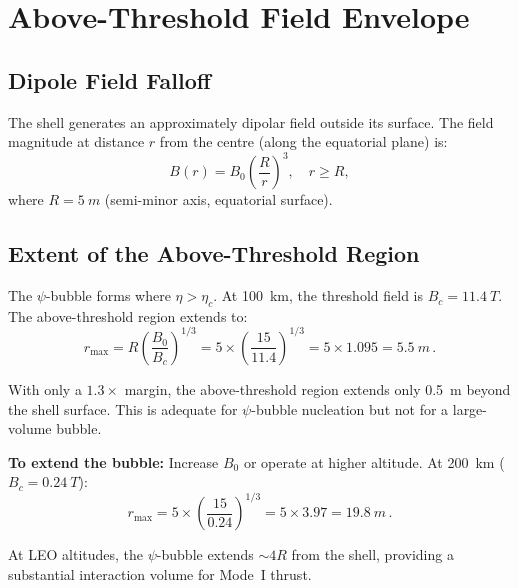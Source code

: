 \documentclass[11pt,a4paper]{article}
\begin{document}
\section{Above-Threshold Field Envelope}\label{sec:field_envelope}

\subsection{Dipole Field Falloff}

The shell generates an approximately dipolar field outside its surface.
The field magnitude at distance $r$ from the centre (along the equatorial
plane) is:
\begin{equation}
B(r) = B_0 \left(\frac{R}{r}\right)^3, \quad r \geq R,
\end{equation}
where $R = \SI{5}{m}$ (semi-minor axis, equatorial surface).

\subsection{Extent of the Above-Threshold Region}

The $\psi$-bubble forms where $\eta > \eta_c$. At \SI{100}{km}, the threshold
field is $B_c = \SI{11.4}{T}$. The above-threshold region extends to:
\begin{equation}
r_{\mathrm{max}} = R \left(\frac{B_0}{B_c}\right)^{1/3}
= 5 \times \left(\frac{15}{11.4}\right)^{1/3}
= 5 \times 1.095 = \SI{5.5}{m}\,.
\end{equation}

With only a $1.3\times$ margin, the above-threshold region extends only
\SI{0.5}{m} beyond the shell surface. This is adequate for $\psi$-bubble
nucleation but not for a large-volume bubble.

\textbf{To extend the bubble:} Increase $B_0$ or operate at higher altitude.
At \SI{200}{km} ($B_c = \SI{0.24}{T}$):
\begin{equation}
r_{\mathrm{max}} = 5 \times \left(\frac{15}{0.24}\right)^{1/3}
= 5 \times 3.97 = \SI{19.8}{m}\,.
\end{equation}

At LEO altitudes, the $\psi$-bubble extends $\sim\!4R$ from the shell,
providing a substantial interaction volume for Mode~I thrust.

\end{document}
